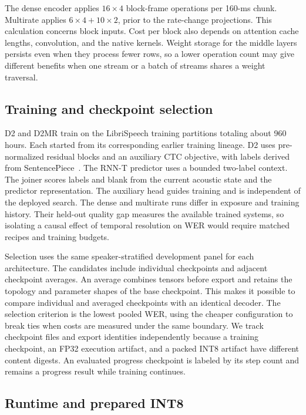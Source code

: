 \documentclass[conference]{IEEEtran}
\begin{document}
The dense encoder applies $16 \times 4$ block-frame operations per 160-ms
chunk. Multirate applies $6 \times 4+10 \times 2$, prior to the rate-change
projections. This calculation concerns block inputs. Cost per block also
depends on attention cache lengths, convolution, and the native kernels.
Weight storage for the middle layers persists even when they process fewer
rows, so a lower operation count may give different benefits when one stream
or a batch of streams shares a weight traversal.

\subsection{Training and checkpoint selection}

D2 and D2MR train on the LibriSpeech training partitions totaling about 960
hours. Each started from its corresponding earlier training lineage. D2 uses
pre-normalized residual blocks and an auxiliary CTC objective, with labels
derived from SentencePiece~\cite{kudo2018sentencepiece}. The RNN-T predictor
uses a bounded two-label context. The joiner scores labels and blank from
the current acoustic state and the predictor representation. The auxiliary
head guides training and is independent of the deployed search. The dense
and multirate runs differ in exposure and training history. Their held-out
quality gap measures the available trained systems, so isolating a causal
effect of temporal resolution on WER would require matched recipes and
training budgets.

Selection uses the same speaker-stratified development panel for each
architecture. The candidates include individual checkpoints and adjacent
checkpoint averages. An average combines tensors before export and retains
the topology and parameter shapes of the base checkpoint. This makes it
possible to compare individual and averaged checkpoints with an identical
decoder. The selection criterion is the lowest pooled WER, using the cheaper
configuration to break ties when costs are measured under the same boundary.
We track checkpoint files and export identities independently because a
training checkpoint, an FP32 execution artifact, and a packed INT8 artifact
have different content digests. An evaluated progress checkpoint is labeled
by its step count and remains a progress result while training continues.

\subsection{Runtime and prepared INT8}
\end{document}

